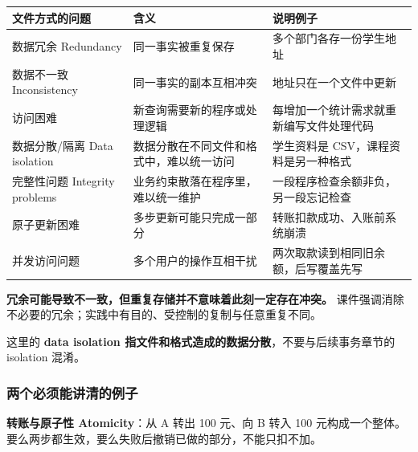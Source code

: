 \begin{longtable}[]{@{}
  >{\raggedright\arraybackslash}p{}
  >{\raggedright\arraybackslash}p{}
  >{\raggedright\arraybackslash}p{}@{}}
\toprule\noalign{}
\begin{minipage}[b]{\linewidth}\raggedright
文件方式的问题
\end{minipage} & \begin{minipage}[b]{\linewidth}\raggedright
含义
\end{minipage} & \begin{minipage}[b]{\linewidth}\raggedright
说明例子
\end{minipage} \\
\midrule\noalign{}
\endhead
\bottomrule\noalign{}
\endlastfoot
数据冗余 Redundancy & 同一事实被重复保存 & 多个部门各存一份学生地址 \\
数据不一致 Inconsistency & 同一事实的副本互相冲突 & 地址只在一个文件中更新 \\
访问困难 & 新查询需要新的程序或处理逻辑 & 每增加一个统计需求就重新编写文件处理代码 \\
数据分散/隔离 Data isolation & 数据分散在不同文件和格式中，难以统一访问 & 学生资料是 CSV，课程资料是另一种格式 \\
完整性问题 Integrity problems & 业务约束散落在程序里，难以统一维护 & 一段程序检查余额非负，另一段忘记检查 \\
原子更新困难 & 多步更新可能只完成一部分 & 转账扣款成功、入账前系统崩溃 \\
并发访问问题 & 多个用户的操作互相干扰 & 两次取款读到相同旧余额，后写覆盖先写 \\
\end{longtable}

\textbf{冗余可能导致不一致，但重复存储并不意味着此刻一定存在冲突。} 课件强调消除不必要的冗余；实践中有目的、受控制的复制与任意重复不同。

这里的 \textbf{data isolation 指文件和格式造成的数据分散}，不要与后续事务章节的 isolation 混淆。

\subsubsection{两个必须能讲清的例子}\label{01_database_fundamentals_zh-ux4e24ux4e2aux5fc5ux987bux80fdux8bb2ux6e05ux7684ux4f8bux5b50}

\textbf{转账与原子性 Atomicity}：从 A 转出 100 元、向 B 转入 100 元构成一个整体。要么两步都生效，要么失败后撤销已做的部分，不能只扣不加。

